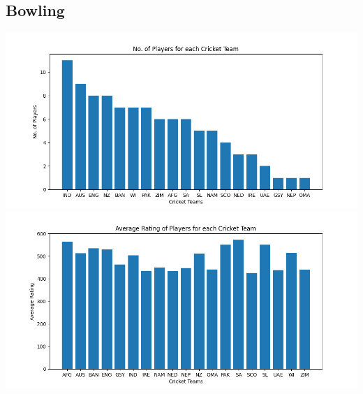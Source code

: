 \documentclass{article}
\begin{document}
\begin{normalsize}
            \subsection{Bowling}\label{subsec:bowling1}
                \includegraphics[scale=0.75]{t20i_bowling_3-10-2023-1}
                \includegraphics[scale=0.75]{t20i_bowling_3-10-2023-2}

\end{normalsize}
\end{document}
